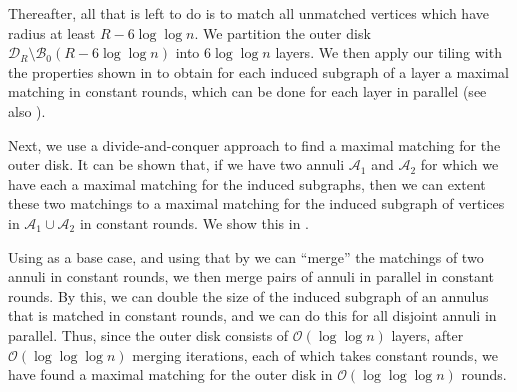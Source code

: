 \documentclass[letterpaper,11pt]{article}
\newcommand{\B}{\mathcal B}
\newcommand{\disk}{\ensuremath{\mathcal D_R}\xspace}
\newcommand{\1}{\mathbb I}
\newcommand{\bigO}{\mathcal{O}}
\begin{document}
Thereafter, all that is left to do is to match all unmatched vertices which have radius at least $R - 6\log\log n$. We partition the outer disk $\disk \setminus \B_0(R - 6\log\log n)$ into $6\log\log n$ layers. We then apply our tiling with the properties shown in  to obtain for each induced subgraph of a layer a maximal matching in constant rounds, which can be done for each layer in parallel (see also ).

Next, we use a divide-and-conquer approach to find a maximal matching for the outer disk. It can be shown that, if we have two annuli $\mathcal{A}_1$ and $\mathcal{A}_2$ for which we have each a maximal matching for the induced subgraphs, then we can extent these two matchings to a maximal matching for the induced subgraph of vertices in $\mathcal{A}_1 \cup \mathcal{A}_2$ in constant rounds. We show this in .

Using  as a base case, and using that by  we can ``merge'' the matchings of two annuli in constant rounds, we then merge pairs of annuli in parallel in constant rounds. By this, we can double the size of the induced subgraph of an annulus that is matched in constant rounds, and we can do this for all disjoint annuli in parallel. Thus, since the outer disk consists of $\bigO(\log\log n)$ layers, after $\bigO(\log\log\log n)$ merging iterations, each of which takes constant rounds, we have found a maximal matching for the outer disk in $\bigO(\log\log\log n)$ rounds. 
\end{document}
